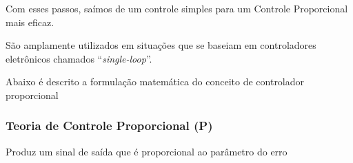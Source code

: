 \documentclass[portugues, brazil, a4paper,12pt]{article}
\begin{document}
		Com esses passos, saímos de um controle simples para um Controle Proporcional mais eficaz.

		São amplamente utilizados em situações que se baseiam em controladores eletrônicos chamados ``\textit{single-loop}''.

		Abaixo é descrito a formulação matemática do conceito de controlador proporcional

	\subsubsection{Teoria de Controle Proporcional (P)} \label{sec:P}
		Produz um sinal de saída que é proporcional ao parâmetro do erro
\end{document}
